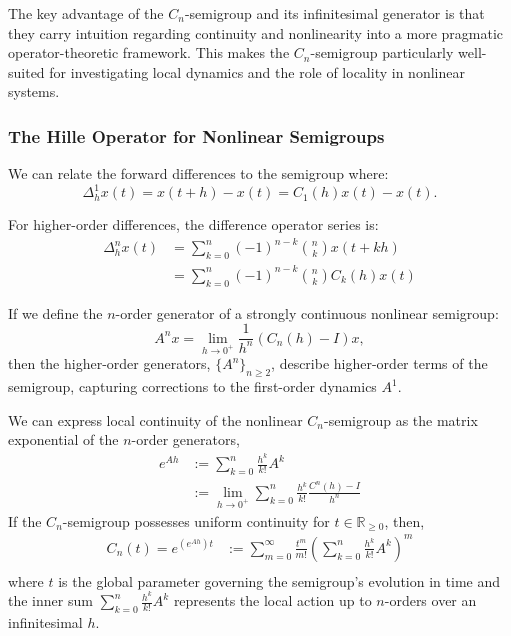 \documentclass{article}
\newcommand{\R}{\mathbb{R}}
\begin{document}
The key advantage of the $C_n$-semigroup and its infinitesimal generator is that they carry intuition regarding continuity and nonlinearity into a more pragmatic operator-theoretic framework. This makes the $C_n$-semigroup particularly well-suited for investigating local dynamics and the role of locality in nonlinear systems.

\subsubsection{The Hille Operator for Nonlinear Semigroups}

We can relate the forward differences to the semigroup where:
$$
    \Delta_h^1 x(t) = x(t+h) - x(t) = C_1(h) x(t) - x(t).
$$ 

For higher-order differences, the difference operator series is:
\begin{align}
    \Delta_h^n x(t) &= \sum_{k=0}^n (-1)^{n-k} {n \choose k} x(t+kh) \nonumber \\
    &= \sum_{k=0}^n (-1)^{n-k} {n \choose k} C_k(h) x(t) \label{eq:delta_c}
\end{align}

If we define the $n$-order generator of a strongly continuous nonlinear semigroup:
$$
    A^n x = \lim_{h\rightarrow0^+} \frac{1}{h^n} (C_n(h) - I) x,
$$
then the higher-order generators, $\{A^n\}_{n\geq2}$, describe higher-order terms of the semigroup, capturing corrections to the first-order dynamics \( A^1 \).

We can express local continuity of the nonlinear $C_n$-semigroup as the matrix exponential of the $n$-order generators,
\begin{align*}
    e^{Ah} &:= \sum_{k=0}^n \frac{h^k}{k!} A^k\\
     &:= \lim_{h\rightarrow0^+} \sum_{k=0}^n \frac{h^k}{k!} \frac{C^n(h) - I}{h^n} 
\end{align*}
If the $C_n$-semigroup possesses uniform continuity for $t\in\R_{\geq0}$, then,
\begin{align*}
    C_n(t) = e^{(e^{Ah})t} &:= \sum_{m=0}^\infty \frac{t^m}{m!} \left(\sum_{k=0}^n \frac{h^k}{k!} A^k\right)^m\\
\end{align*}
where $t$ is the global parameter governing the semigroup's evolution in time and the inner sum $\sum_{k=0}^n \frac{h^k}{k!} A^k$ represents the local action up to $n$-orders over an infinitesimal $h$. 
\end{document}
